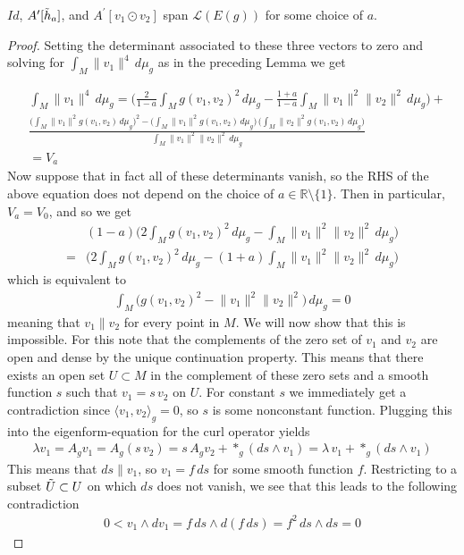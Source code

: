 \documentclass[10pt,a4paper]{amsart}
\begin{document}
\begin{lem}
\label{lemma: transversality of curl operator}
    $Id$, $A^{\prime}[\Tilde{h}_a]$, and $A^{\prime}[v_1\odot v_2]$ span $\mathcal{L}(E(g))$ for some choice of $a$.
\end{lem}

\begin{proof}
    Setting the determinant associated to these three vectors to zero and solving for $\int_M \lVert v_1\rVert^4\,d\mu_g$ as in the preceding Lemma we get

\begin{align*}
&\int_M\lVert v_1\rVert^4\,d\mu_g=\bigg(\frac{2}{1-a}\int_M g(v_1,v_2)^2\,d\mu_g-\frac{1+a}{1-a}\int_M \lVert v_1\rVert^2 \lVert v_2\rVert ^2\,d\mu_g\bigg)+\\
&\frac{\bigg(\int_M \lVert v_1 \rVert^2 g(v_1,v_2)\,d\mu_g\bigg)^2-\bigg(\int_M \lVert v_1 \rVert^2 g(v_1,v_2)\,d\mu_g\bigg)\,\bigg(\int_M \lVert v_2 \rVert^2 g(v_1,v_2)\,d\mu_g\bigg)}{\int_M \lVert v_1\rVert^2 \lVert v_2\rVert^2\,d\mu_g}\\
& =V_a
\end{align*}
Now suppose that in fact all of these determinants vanish, so the RHS of the above equation does not depend on the choice of $a\in \mathbb{R}\setminus \{1\}$. Then in particular, $V_a=V_0$, and so we get 
\begin{align*}
    &(1-a)\bigg(2\int_M g(v_1,v_2)^2\,d\mu_g-\int_M \lVert v_1\rVert^2\lVert v_2\rVert^2\,d\mu_g\bigg)\\
    =&\bigg(2\int_M g(v_1,v_2)^2\,d\mu_g-(1+a)\int_M \lVert v_1\rVert^2\lVert v_2\rVert^2\,d\mu_g\bigg)
\end{align*}
which is equivalent to 
\begin{align*}
    \int_M \big(g(v_1,v_2)^2-\lVert v_1\rVert^2\lVert v_2\rVert^2\big)\,d\mu_g=0
\end{align*}
meaning that $v_1\parallel v_2$ for every point in $M$. We will now show that this is impossible.
For this note that the complements of the zero set of $v_1$ and $v_2$ are open and dense by the unique continuation property. This means that there exists an open set $U\subset M$ in the complement of these zero sets and a smooth function $s$ such that $v_1=s\,v_2$ on $U$. For constant $s$ we immediately get a contradiction since $\langle v_1,v_2\rangle_g=0$, so $s$ is some nonconstant function. Plugging this into the eigenform-equation for the curl operator yields
\begin{align*}
    \lambda v_1=A_g v_1=A_g (s\,v_2)=s\,A_g v_2 +\ast_g (ds\wedge v_1)=\lambda\,v_1+\ast_g (ds\wedge v_1)
\end{align*}
This means that $ds\parallel v_1$, so $v_1=f\,ds$ for some smooth function $f$. Restricting to a subset $\Tilde{U}\subset U$ on which $ds$ does not vanish, we see that this leads to the following contradiction
\begin{align*}
    0 < v_1\wedge dv_1 = f\,ds\wedge d(f\,ds)=f^2\,ds\wedge ds =0
\end{align*}
\end{proof}
\end{document}

